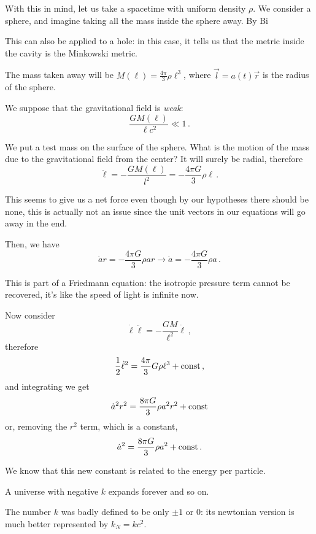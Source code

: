\documentclass[main.tex]{subfiles}
\begin{document}
With this in mind, let us take a spacetime with uniform density \(\rho\).
We consider a sphere, and imagine taking all the mass inside the sphere away.
By Bi

This can also be applied to a hole: in this case, it tells us that the metric inside the cavity is the Minkowski metric.

The mass taken away will be \(M(\ell) = \frac{4 \pi}{3} \rho \ell^{3}\), where \(\vec{l} = a(t) \vec{r}\) is the radius of the sphere.

We suppose that the gravitational field is \emph{weak}:
\begin{equation}
  \frac{GM(\ell)}{\ell c^2} \ll 1\,.
\end{equation}

We put a test mass on the surface of the sphere. What is the motion of the mass due to the gravitational field from the center? It will surely be radial, therefore
\begin{equation}
  \ddot{\ell} = - \frac{GM(\ell)}{l^2} = - \frac{4 \pi G}{3} \rho \ell\,.
\end{equation}

This seems to give us a net force even though by our hypotheses there should be none, this is actually not an issue since the unit vectors in our equations will go away in the end.

Then, we have
\begin{equation}
  \ddot{a} r = - \frac{4 \pi G}{3} \rho a r
  \to
  \ddot{a} = - \frac{4 \pi G}{3} \rho a\,.
\end{equation}

This is part of a Friedmann equation: the isotropic pressure term cannot be recovered, it's like the speed of light is infinite now.

Now consider 
\begin{equation}
  \dot{\ell} \ddot{\ell} = - \frac{GM}{\ell^2} \dot{\ell}\,,
\end{equation}
%
therefore 
%
\begin{equation}
  \frac{1}{2}\dot{\ell}^2 = \frac{4 \pi}{3} G \rho \ell^{3} + \text{const}\,,
\end{equation}
%
and integrating we get
%
\begin{equation}
  \dot{a}^2 r^2 = \frac{8 \pi G}{3} \rho a^2 r^2 + \text{const}
\end{equation}
%
or, removing the \(r^2\) term, which is a constant,
%
\begin{equation}
    \dot{a}^2 = \frac{8 \pi G}{3} \rho a^2 + \text{const}\,.
\end{equation}

We know that this new constant is related to the energy per particle. 

A universe with negative \(k\) expands forever and so on.

The number \(k\) was badly defined to be only \(\pm 1\) or 0: its newtonian version is much better represented by \(k_N = kc^2\).
\end{document}
